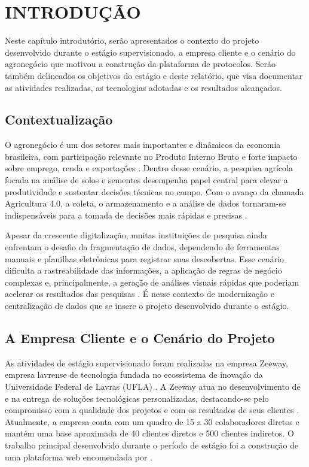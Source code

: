 \chapter{\MakeUppercase{Introdução}}

Neste capítulo introdutório, serão apresentados o contexto do projeto desenvolvido durante o estágio supervisionado, a empresa cliente e o cenário do agronegócio que motivou a construção da plataforma de protocolos. Serão também delineados os objetivos do estágio e deste relatório, que visa documentar as atividades realizadas, as tecnologias adotadas e os resultados alcançados.

\section{Contextualização}
O agronegócio é um dos setores mais importantes e dinâmicos da economia brasileira, com participação relevante no Produto Interno Bruto e forte impacto sobre emprego, renda e exportações \cite{CepeaCNA2025}. Dentro desse cenário, a pesquisa agrícola focada na análise de solos e sementes desempenha papel central para elevar a produtividade e sustentar decisões técnicas no campo. Com o avanço da chamada Agricultura 4.0, a coleta, o armazenamento e a análise de dados tornaram-se indispensáveis para a tomada de decisões mais rápidas e precisas \cite{Embrapa2019}.

Apesar da crescente digitalização, muitas instituições de pesquisa ainda enfrentam o desafio da fragmentação de dados, dependendo de ferramentas manuais e planilhas eletrônicas para registrar suas descobertas. Esse cenário dificulta a rastreabilidade das informações, a aplicação de regras de negócio complexas e, principalmente, a geração de análises visuais rápidas que poderiam acelerar os resultados das pesquisas \cite{Embrapa2019}. É nesse contexto de modernização e centralização de dados que se insere o projeto desenvolvido durante o estágio.

\section{A Empresa Cliente e o Cenário do Projeto}
As atividades de estágio supervisionado foram realizadas na empresa Zeeway, empresa lavrense de tecnologia fundada no ecossistema de inovação da Universidade Federal de Lavras (UFLA) \cite{Zeeway2026}. A Zeeway atua no desenvolvimento de  e na entrega de soluções tecnológicas personalizadas, destacando-se pelo compromisso com a qualidade dos projetos e com os resultados de seus clientes \cite{Zeeway2026}. Atualmente, a empresa conta com um quadro de 15 a 30 colaboradores diretos e mantém uma base aproximada de 40 clientes diretos e 500 clientes indiretos. O trabalho principal desenvolvido durante o período de estágio foi a construção de uma plataforma web encomendada por .

